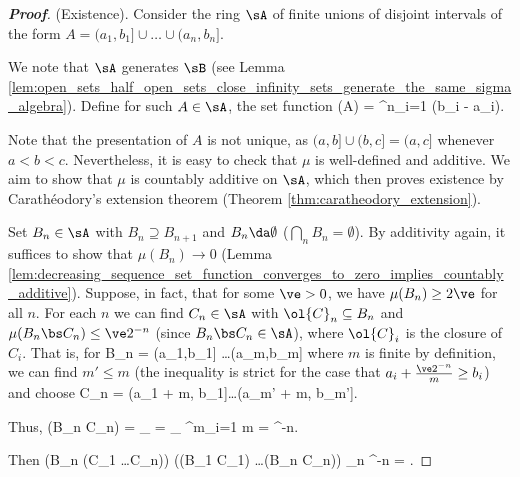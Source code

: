 \begin{proof}[\bf Proof]
(Existence). Consider the ring $\sA$ of finite unions of disjoint intervals of the form $A = (a_1, b_1] \cup \dots\cup (a_n, b_n]$.

We note that $\sA$ generates $\sB$ (see Lemma \ref{lem:open_sets_half_open_sets_close_infinity_sets_generate_the_same_sigma_algebra}). Define for such $A \in \sA$, the set function
\be
\mu(A) = \sum^n_{i=1} (b_i - a_i).
\ee

Note that the presentation of $A$ is not unique, as $(a, b] \cup (b, c] = (a, c]$ whenever $a < b < c$. Nevertheless, it is easy to check that $\mu$ is well-defined and additive. We aim to show that
$\mu$ is countably additive on $\sA$, which then proves existence by Carath\'eodory's extension theorem (Theorem \ref{thm:caratheodory_extension}).


Set $B_n \in \sA$ with $B_n\supseteq B_{n+1}$ and $B_n \da \emptyset$ ($\bigcap_n B_n = \emptyset$). By additivity again, it suffices to show that $\mu(B_n) \to 0$ (Lemma \ref{lem:decreasing_sequence_set_function_converges_to_zero_implies_countably_additive}). Suppose, in fact, that for some $\ve > 0$, we have $\mu(B_n) \geq 2\ve$ for all $n$. For each $n$ we can find $C_n \in \sA$ with $\ol{C}_n \subseteq B_n$ and $\mu(B_n \bs C_n) \leq \ve 2^{-n}$ (since $B_n\bs C_n\in \sA$), where $\ol{C}_i$ is the closure of $C_i$. That is, for
\be
B_n = (a_1,b_1] \cup \dots \cup (a_m,b_m]
\ee
where $m$ is finite by definition, we can find $m'\leq m$ (the inequality is strict for the case that $a_i + \frac{\ve 2^{-n}}m \geq b_i $) and choose
\be
C_n = \left(a_1 + m, b_1\right]\bigcup \dots \bigcup \left(a_{m'} + m, b_{m'}\right].
\ee

Thus,
\be
\mu(B_n \bs C_n) = _{\mu} = _{\mu} \leq \sum\limits^m_{i=1} m = ^{-n}.
\ee

Then
\be
\mu(B_n \bs (C_1 \cap \dots\cap C_n)) \leq \mu((B_1 \bs C_1) \cup \dots\cup (B_n \bs C_n)) \leq \sum_{n \in\N} ^{-n} = \ve.
\ee


\end{proof}
